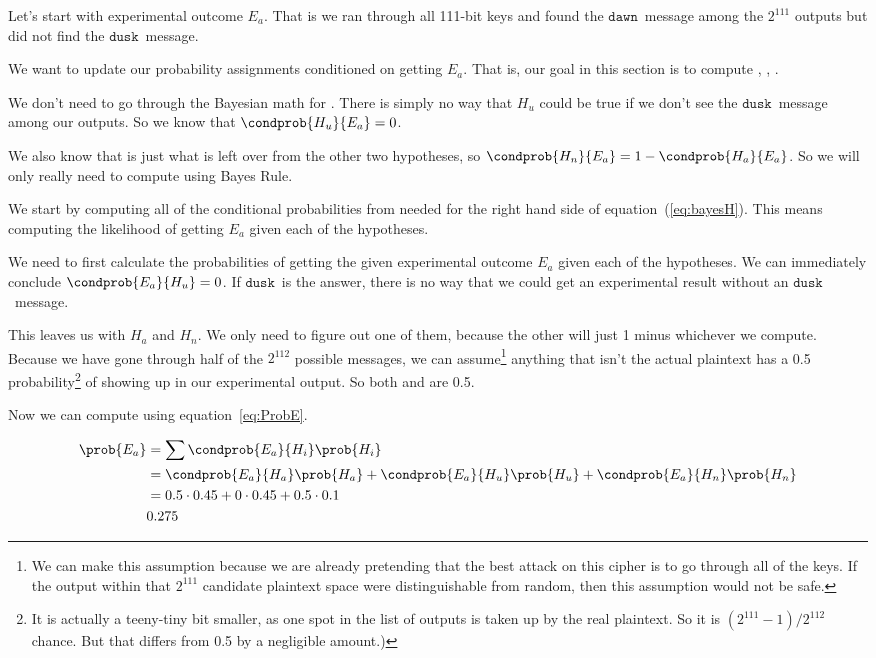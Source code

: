 \documentclass{article}
\newcommand\mdusk{\ensuremath{\mathtt{dusk}}}
\newcommand\mdawn{\ensuremath{\mathtt{dawn}}}
\begin{document}
Let's start with experimental outcome $E_a$. That is we ran through all 111-bit keys and found the \mdawn\ message among the $2^{111}$ outputs but did not find the \mdusk\ message.

We want to update our probability assignments conditioned on getting $E_a$. That is, our goal in this section is to compute , , .

We don't need to go through the Bayesian math for .
There is simply no way that $H_u$ could be true if we don't see the \mdusk\ message among our outputs. So we know that $\condprob{H_u}{E_a} = 0$.

We also know that  is just what is left over from the other two hypotheses, so $\condprob{H_n}{E_a} = 1 - \condprob{H_a}{E_a}$.
So we will only really need to compute  using Bayes Rule.


We start by computing all of the conditional probabilities from needed for the right hand side of equation~(\ref{eq:bayesH}). This means computing the likelihood of getting $E_a$ given each of the hypotheses. 

We need to first calculate the probabilities of getting the given experimental outcome $E_a$ given each of the hypotheses.
We can immediately conclude $\condprob{E_a}{H_u} = 0$.
If \mdusk\ is the answer, there is no way that we could get an experimental result without an \mdusk\ message.

This leaves us with $H_a$ and $H_n$.
We only need to figure out one of them, because the other will just 1 minus whichever we compute.
Because we have gone through half of the $2^{112}$ possible messages,
we can assume\footnote{%
    We can make this assumption because we are already pretending that the best attack on this cipher is to go through all of the keys. If the output within that $2^{111}$ candidate plaintext space were distinguishable from random, then this assumption would not be safe.
}
anything that isn't the actual plaintext has a 0.5 probability\footnote{%
    It is actually a teeny-tiny bit smaller, as one spot in the list of outputs
    is taken up by the real plaintext. So it is $(2^{111}-1)/2^{112}$ chance.
    But that differs from 0.5 by a negligible amount.)
}
of showing up in our experimental output.
So both  and  are 0.5.

Now we can compute  using equation~\ref{eq:ProbE}.

\begin{equation}
    \begin{split}
        \prob{E_a}  &= \sum \condprob{E_a}{H_i}\prob{H_i} \\
                    &= \condprob{E_a}{H_a}\prob{H_a}
                        + \condprob{E_a}{H_u}\prob{H_u}
                        + \condprob{E_a}{H_n}\prob{H_n} \\
                    &= 0.5 \cdot 0.45 + 0 \cdot 0.45 + 0.5 \cdot 0.1 \\
                    & 0.275
    \end{split}
\end{equation}
\end{document}
